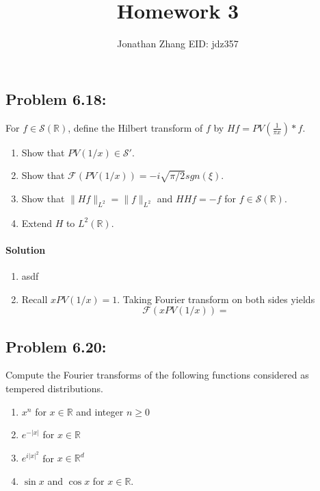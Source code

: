 \documentclass[letterpaper,twoside,11pt]{article}
\theoremstyle{mystyle}
\newcommand{\R}{{\mathbb R}}
\newcommand{\sch}{\mathcal S}
\begin{document}
\title{\vspace{-2\baselineskip} 
Homework 3
}
\author{Jonathan Zhang \qquad EID: { jdz357} }
\date{}
\maketitle


\subsection*{Problem 6.18:}
 For $f\in \mathcal S (\R)$, define the Hilbert transform of $f$ by $Hf = PV\left( \frac{1}{\pi x} \right) \ast f$.
\begin{enumerate}
  \item Show that $PV(1/x)\in \sch '$.
  \item Show that $\mathcal F \left( PV\left( 1/x \right) \right) = -i\sqrt{\pi/2} sgn\left( \xi \right)$. 
  \item Show that $\|Hf\|_{L^2} = \|f\|_{L^2}$ and $HHf = -f$ for $f \in \sch \left( \R \right)$.  
  \item Extend $H$ to $L^2\left( \R \right)$. 
\end{enumerate}

\paragraph*{Solution}
\begin{enumerate}
  \item asdf
  \item Recall $xPV\left( 1/x \right)=1$. Taking Fourier transform on both sides yields 
  \[\mathcal F \left( xPV\left( 1/x \right) \right) = \]
\end{enumerate}


\subsection*{Problem 6.20:}
Compute the Fourier transforms of the following functions considered as tempered distributions. 
\begin{enumerate}
  \item $x^n$ for $x \in \R$ and integer $n\geq 0$
  \item $e^{-|x|}$ for $x\in \R$
  \item $e^{i|x|^2}$ for $x \in \R^d$
  \item $\sin x$ and $\cos x$ for $x\in \R$. 
\end{enumerate}
\end{document}

